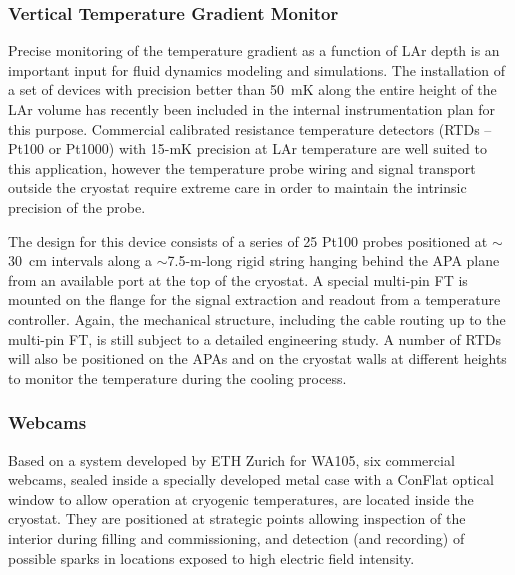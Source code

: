 \subsubsection{Vertical Temperature Gradient Monitor}

	Precise monitoring of the temperature gradient as a function of LAr depth is %
	an important input for fluid dynamics modeling and simulations. The installation of a set of devices with precision better than 50~mK
	along the entire height of the LAr volume %
	has recently  been included in the internal instrumentation plan  for this purpose.
	Commercial calibrated resistance temperature detectors (RTDs -- Pt100 or Pt1000) with 15-mK precision at LAr temperature are well suited to this application, however the temperature probe wiring and signal transport outside the cryostat require extreme care in order to maintain %
	the intrinsic precision of the probe.
	
The %
design for this device consists of a series of 25 Pt100 probes positioned at $\sim$30~cm intervals %
along a $\sim$7.5-m-long rigid string hanging behind the APA plane from %
an available port %
at the top of the cryostat. A special multi-pin FT is mounted on the flange %
for the signal extraction and readout from a temperature controller.  
Again, the mechanical structure, including the cable routing up to the multi-pin FT, is still subject to a detailed engineering study.
A number of RTDs will also be positioned on the APAs and on the cryostat walls at different heights to monitor the temperature %
during the cooling process. %

\subsubsection{Webcams}
	Based on %
	a system developed by ETH Zurich for WA105, six commercial webcams, sealed inside a specially developed metal case with a ConFlat optical window to allow operation at cryogenic temperatures, are located inside the cryostat. They are positioned at strategic points allowing inspection of the interior during filling and commissioning, %
	and detection (and recording) of possible sparks in locations exposed to high %
	electric field intensity.
	

